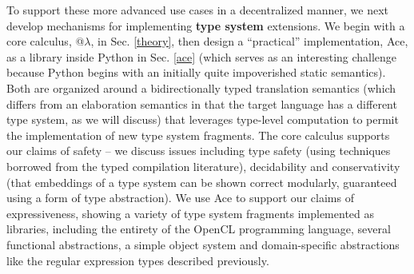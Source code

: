 To support these more advanced use cases in a decentralized manner, we next develop mechanisms for implementing \textbf{type system} extensions. We begin with a core calculus, @$\lambda$, in Sec. \ref{theory}, then design a ``practical'' implementation, Ace, as a library inside Python in Sec. \ref{ace} (which serves as an interesting challenge because Python begins with an initially quite impoverished static semantics). Both are organized around a bidirectionally typed translation semantics (which differs from an elaboration semantics in that the target language has a different type system, as we will discuss) that leverages type-level computation to permit the implementation of new type system fragments.
The core calculus supports our claims of safety -- we discuss issues including type safety (using techniques borrowed from the typed compilation literature), decidability and conservativity (that embeddings of a type system can be shown correct modularly, guaranteed using a form of type abstraction). We use Ace to support our claims of expressiveness, showing a variety of type system fragments implemented as libraries, including the entirety of the OpenCL programming language, several functional abstractions, a simple object system and domain-specific abstractions like the regular expression types described previously.%
%

